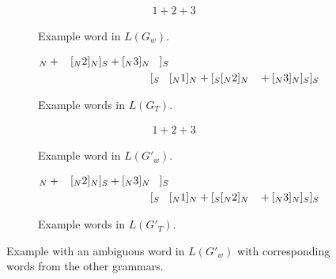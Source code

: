 \documentclass[sigplan]{acmart}\settopmatter{printfolios=true,printccs=false,printacmref=false}
\begin{document}
\begin{figure*}[ht]
  \begin{subfigure}[b]{.45\linewidth}
    \begin{align*}
      1 + 2 + 3
    \end{align*}
    \caption{Example word in $L(G_w)$.}
  \end{subfigure}
  \begin{subfigure}[b]{.45\linewidth}
      \begin{align*}
        [_S           [_S  &[_N 1 ]_N + \hphantom{[_S} [_N 2 ]_N           ]_S  + [_N 3 ]_N \hphantom{]_S} ]_S \\
        [_S \hphantom{[_S} &[_N 1 ]_N +           [_S  [_N 2 ]_N \hphantom{]_S} + [_N 3 ]_N           ]_S  ]_S
      \end{align*}
    \caption{Example words in $L(G_T)$.}
  \end{subfigure}

  \begin{subfigure}[b]{.45\linewidth}
    \begin{align*}
      1 + 2 + 3
    \end{align*}
    \caption{Example word in $L(G'_w)$.}
  \end{subfigure}
  \begin{subfigure}[b]{.45\linewidth}
      \begin{align*}
        [_S            [_S &[_N 1 ]_N + \hphantom{[_S} [_N 2 ]_N            ]_S + [_N 3 ]_N \hphantom{]_S}]_S \\
        [_S \hphantom{[_S} &[_N 1 ]_N +            [_S [_N 2 ]_N \hphantom{]_S} + [_N 3 ]_N ]_S ]_S
      \end{align*}
    \caption{Example words in $L(G'_T)$.}
  \end{subfigure}
  \caption{Example with an ambiguous word in $L(G'_w)$ with corresponding words from the other grammars.}
  \label{fig:ambig-example-square}
\end{figure*}
\end{document}
